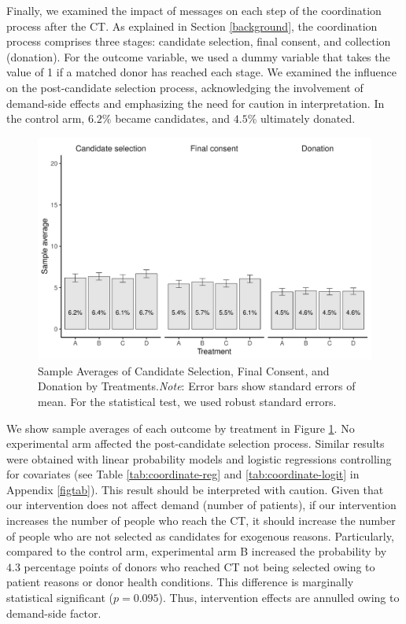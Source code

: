 \documentclass[12pt, a4paper]{article}
\begin{document}
Finally, we examined the impact of messages on each step of the coordination process after the CT. As explained in Section \ref{background}, the coordination process comprises three stages: candidate selection, final consent, and collection (donation). For the outcome variable, we used a dummy variable that takes the value of 1 if a matched donor has reached each stage. We examined the influence on the post-candidate selection process, acknowledging the involvement of demand-side effects and emphasizing the need for caution in interpretation. In the control arm, \(6.2\)\% became candidates, and \(4.5\)\% ultimately donated.

\begin{figure}[t]
\includegraphics{JMDP RCT - Main Document_files/figure-latex/coordinate-diff-mean-1} \caption{Sample Averages of Candidate Selection, Final Consent, and Donation by Treatments.\newline \emph{Note}: Error bars show standard errors of mean. For the statistical test, we used robust standard errors.}\label{fig:coordinate-diff-mean}
\end{figure}

We show sample averages of each outcome by treatment in Figure \ref{fig:coordinate-diff-mean}. No experimental arm affected the post-candidate selection process. Similar results were obtained with linear probability models and logistic regressions controlling for covariates (see Table \ref{tab:coordinate-reg} and \ref{tab:coordinate-logit} in Appendix \ref{figtab}). This result should be interpreted with caution. Given that our intervention does not affect demand (number of patients), if our intervention increases the number of people who reach the CT, it should increase the number of people who are not selected as candidates for exogenous reasons. Particularly, compared to the control arm, experimental arm B increased the probability by \(4.3\) percentage points of donors who reached CT not being selected owing to patient reasons or donor health conditions. This difference is marginally statistical significant (\(p = 0.095\)). Thus, intervention effects are annulled owing to demand-side factor.
\end{document}
